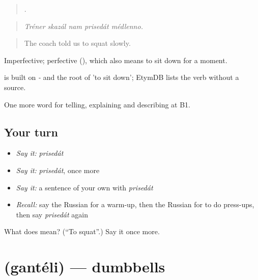 \begin{quote}
    .
\end{quote}

\begin{quote}
\emph{Tréner skazál nam prisedát médlenno.}
\end{quote}

\begin{quote}
The coach told us to squat slowly.
\end{quote}

Imperfective; perfective  (), which also means to sit down for a moment.

\begin{cousinweb}
\emph{} is built on \emph{-} and the root of \emph{} 'to sit down'; EtymDB lists the verb without a source.
\end{cousinweb}

\begin{grammarlens}[title={What you've built}]
One more word for telling, explaining and describing at B1.
\end{grammarlens}

\subsection*{Your turn}
\begin{itemize}
\raggedright
  \item \emph{Say it:} \emph{prisedát}
  \item \emph{Say it:} \emph{prisedát}, once more
  \item \emph{Say it:} a sentence of your own with \emph{prisedát}
  \item \emph{Recall:} say the Russian for a warm-up, then the Russian for to do press-ups, then say \emph{prisedát} again
\end{itemize}

\begin{tcolorbox}[breakable,colback=teal!4,colframe=teal!35!black,title={Before you move on}]
What does  mean? (\textquotedblleft{}To squat\textquotedblright{}.) Say it once more.
\end{tcolorbox}
\section[\texorpdfstring{\ru{гантели} (gantéli)}{гантели (gantéli)}]{ (gantéli) — dumbbells}

